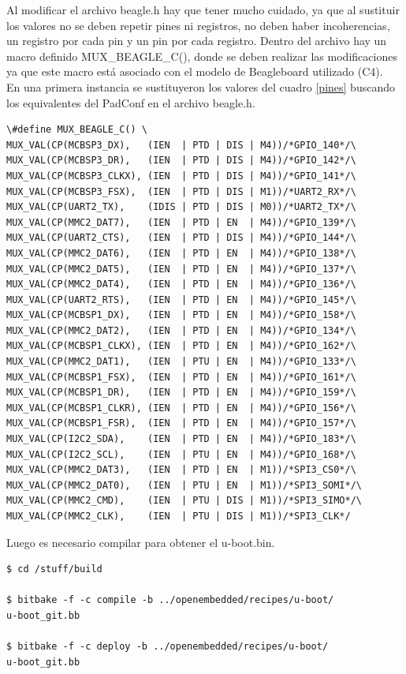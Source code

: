 Al modificar el archivo beagle.h hay que tener mucho cuidado, ya que al sustituir los valores no se deben repetir pines ni registros, no deben haber incoherencias, un registro por cada pin y un pin por cada registro. 
Dentro del archivo hay un macro definido MUX\_BEAGLE\_C(), donde se deben realizar las modificaciones ya que este macro está asociado con el modelo de Beagleboard utilizado (C4).\\
En una primera instancia se sustituyeron los valores del cuadro \ref{pines} buscando los equivalentes del 
PadConf en el archivo beagle.h. 


\begin{verbatim}
\#define MUX_BEAGLE_C() \
MUX_VAL(CP(MCBSP3_DX),   (IEN  | PTD | DIS | M4))/*GPIO_140*/\
MUX_VAL(CP(MCBSP3_DR),   (IEN  | PTD | DIS | M4))/*GPIO_142*/\
MUX_VAL(CP(MCBSP3_CLKX), (IEN  | PTD | DIS | M4))/*GPIO_141*/\
MUX_VAL(CP(MCBSP3_FSX),  (IEN  | PTD | DIS | M1))/*UART2_RX*/\
MUX_VAL(CP(UART2_TX),    (IDIS | PTD | DIS | M0))/*UART2_TX*/\
MUX_VAL(CP(MMC2_DAT7),   (IEN  | PTD | EN  | M4))/*GPIO_139*/\
MUX_VAL(CP(UART2_CTS),   (IEN  | PTD | DIS | M4))/*GPIO_144*/\
MUX_VAL(CP(MMC2_DAT6),   (IEN  | PTD | EN  | M4))/*GPIO_138*/\
MUX_VAL(CP(MMC2_DAT5),   (IEN  | PTD | EN  | M4))/*GPIO_137*/\
MUX_VAL(CP(MMC2_DAT4),   (IEN  | PTD | EN  | M4))/*GPIO_136*/\
MUX_VAL(CP(UART2_RTS),   (IEN  | PTD | EN  | M4))/*GPIO_145*/\
MUX_VAL(CP(MCBSP1_DX),   (IEN  | PTD | EN  | M4))/*GPIO_158*/\
MUX_VAL(CP(MMC2_DAT2),   (IEN  | PTD | EN  | M4))/*GPIO_134*/\
MUX_VAL(CP(MCBSP1_CLKX), (IEN  | PTD | EN  | M4))/*GPIO_162*/\
MUX_VAL(CP(MMC2_DAT1),   (IEN  | PTU | EN  | M4))/*GPIO_133*/\
MUX_VAL(CP(MCBSP1_FSX),  (IEN  | PTD | EN  | M4))/*GPIO_161*/\
MUX_VAL(CP(MCBSP1_DR),   (IEN  | PTD | EN  | M4))/*GPIO_159*/\
MUX_VAL(CP(MCBSP1_CLKR), (IEN  | PTD | EN  | M4))/*GPIO_156*/\
MUX_VAL(CP(MCBSP1_FSR),  (IEN  | PTD | EN  | M4))/*GPIO_157*/\
MUX_VAL(CP(I2C2_SDA),    (IEN  | PTD | EN  | M4))/*GPIO_183*/\
MUX_VAL(CP(I2C2_SCL),    (IEN  | PTU | EN  | M4))/*GPIO_168*/\
MUX_VAL(CP(MMC2_DAT3),   (IEN  | PTD | EN  | M1))/*SPI3_CS0*/\
MUX_VAL(CP(MMC2_DAT0),   (IEN  | PTU | EN  | M1))/*SPI3_SOMI*/\
MUX_VAL(CP(MMC2_CMD),    (IEN  | PTU | DIS | M1))/*SPI3_SIMO*/\
MUX_VAL(CP(MMC2_CLK),    (IEN  | PTU | DIS | M1))/*SPI3_CLK*/
\end{verbatim}

Luego es necesario compilar para obtener el u-boot.bin.

\bigskip
\begin{verbatim}
$ cd /stuff/build

$ bitbake -f -c compile -b ../openembedded/recipes/u-boot/
u-boot_git.bb

$ bitbake -f -c deploy -b ../openembedded/recipes/u-boot/
u-boot_git.bb
\end{verbatim}

